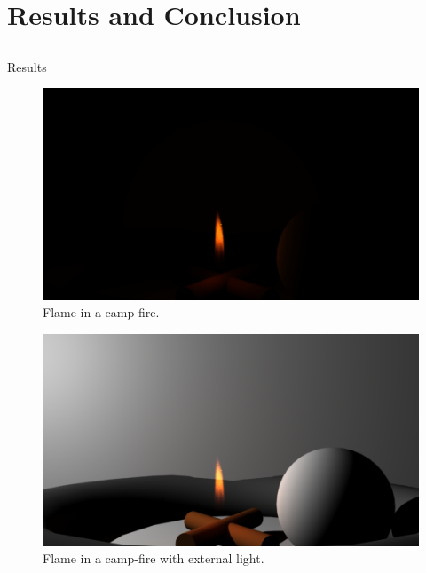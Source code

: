 \documentclass{beamer}
\begin{document}
\section{Results and Conclusion}
\subsection{ }

\begin{frame}[allowframebreaks]{Results}

\begin{figure}[p]
\begin{center}
\includegraphics[width=\textwidth]{img/camp_fire_samples_64} 
\caption*{\tiny{Flame in a camp-fire.}}
\end{center}
\end{figure}

\begin{figure}[p]
\begin{center}
\includegraphics[width=\textwidth]{img/camp_fire_extra_light_samples_64_with_shadow_rays} 
\caption*{\tiny{Flame in a camp-fire with external light.}}
\end{center}
\end{figure}


\end{frame}
\end{document}
